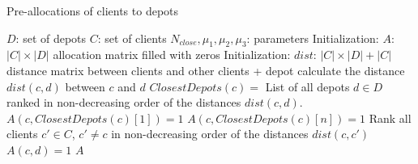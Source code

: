 \documentclass[10pt, a4paper]{article}
\begin{document}
\begin{algorithm}
	\caption{Pre-allocations of clients to depots}
	\label{algo:pre-allocation}
	\begin{algorithmic}[1]
		\REQUIRE  $D$: set of depots
		\REQUIRE $C$: set of clients
		\REQUIRE $N_{close}, \mu_1, \mu_2, \mu_3$: parameters 
		\STATE
		\STATE Initialization: $A$: $|C| \times |D|$ allocation matrix filled with zeros
		\STATE Initialization: $dist$: $|C|\times|D|+|C|$ distance matrix between clients and other clients + depot
		\STATE
				\STATE calculate the distance $dist(c,d)$ between $c$ and $d$
			\ENDFOR
		\ENDFOR
		\STATE
			\STATE $ClosestDepots(c) = $ List of all depots $d \in D$ ranked in non-decreasing order of the distances $dist(c,d)$.
			\STATE 	$A(c,ClosestDepots(c)[1]) =1$ 	
					\STATE 	$A(c,ClosestDepots(c)[n]) =1$ 	
				\ENDIF
			\ENDFOR
		\ENDFOR
		\STATE
			\STATE Rank all clients $c' \in C$, $c' \neq c$ in non-decreasing order of the distances $dist(c,c')$ 
							\STATE $A(c,d) =1$
						\ENDIF
					\ENDFOR
				\ENDIF
			\ENDFOR
		\ENDFOR
		\RETURN $A$
	\end{algorithmic}
\end{algorithm}




\end{document}
